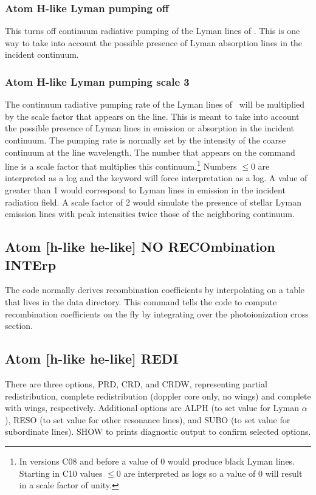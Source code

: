 \subsubsection{Atom H-like Lyman pumping off}  
This turns off continuum radiative pumping of the Lyman lines of \hi.
This is one way to take into account the possible
presence of Lyman absorption lines in the incident continuum.

\subsubsection{Atom H-like Lyman pumping scale 3}
The continuum radiative pumping rate
of the Lyman lines of \hi\ will be multiplied by the scale factor
that appears on the line.
This is meant to take into account the possible presence of
Lyman lines in emission or absorption in the incident continuum.
The pumping
rate is normally set by the intensity of the coarse continuum at the line
wavelength.
The number that appears on the command line is a scale factor
that multiplies this continuum.\footnote{In versions C08 and before a value of 0 would produce black Lyman lines.
Starting in C10 values $\le 0$ are interpreted as logs
so a value of 0 will result in a scale factor of unity.}
Numbers $\le 0$ are interpreted as a log and
the  keyword will force interpretation as a log.
A value of greater than 1 would correspond to Lyman lines
in emission in the incident radiation field.
A scale factor of 
2 would simulate the presence of stellar Lyman emission lines with peak
intensities twice those of the neighboring continuum.

\subsection{Atom [h-like \OR{} he-like] NO RECOmbination INTErp}

The code normally derives recombination coefficients by interpolating
on a table that lives in the data directory.
This command tells the code
to compute recombination coefficients on the fly by integrating over the
photoionization cross section.

\subsection{Atom [h-like \OR{} he-like] REDI}

There are three options, PRD, CRD, and CRDW, representing partial
redistribution, complete redistribution (doppler core only, no wings)
and complete with wings, respectively.  Additional options are ALPH
(to set value for Lyman $\alpha$), RESO (to set value for other
resonance lines), and SUBO (to set value for subordinate lines).  SHOW
to prints diagnostic output to confirm selected options.

